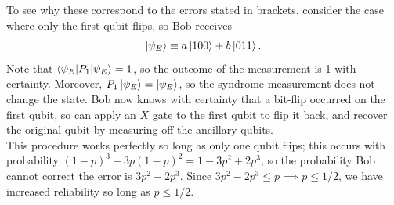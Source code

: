 \documentclass[12pt,a4paper]{report}
\numberwithin{equation}{section}
\theoremstyle{definition}
\theoremstyle{theorem}
\theoremstyle{theorem}
\theoremstyle{example}
\theoremstyle{definition}
\begin{document}
To see why these correspond to the errors stated in brackets, consider the case where only the first qubit flips, so Bob receives
\begin{equation}
	\ket{\psi_{E}}\equiv a\ket{100}+b\ket{011}.
\end{equation}
Note that $\braket{\psi_{E}|P_{1}|\psi_{E}}=1$, so the outcome of the measurement is 1 with certainty. Moreover, $P_{1}\ket{\psi_{E}}=\ket{\psi_{E}}$, so the syndrome measurement does not change the state. Bob now knows with certainty that a bit-flip occurred on the first qubit, so can apply an $X$ gate to the first qubit to flip it back, and recover the original qubit by measuring off the ancillary qubits.\\
This procedure works perfectly so long as only one qubit flips; this occurs with probability $(1-p)^{3}+3p(1-p)^{2}=1-3p^{2}+2p^{3}$, so the probability Bob cannot correct the error is $3p^{2}-2p^{3}$. Since $3p^{2}-2p^{3}\leq p\implies p\leq 1/2$, we have increased reliability so long as $p\leq 1/2$.
\end{document}
